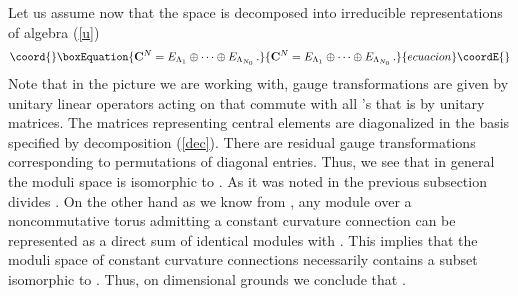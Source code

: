 \documentclass[a4paper,a4paper]{article}
\begin{document}
Let us assume now that the space   \coordHE{} is decomposed into irreducible representations of algebra (\ref{u})
\begin{equation}\coord{}\boxEquation{ \label{dec}
{\bf C}^{N} = E_{\Lambda_{1}}\oplus \dots \oplus E_{\Lambda_{N_{0}}}\, .
}{ {\bf C}^{N} = E_{\Lambda_{1}}\oplus \dots \oplus E_{\Lambda_{N_{0}}}\, .
}{ecuacion}\coordE{}\end{equation}
Note that in the picture we are working with,  gauge transformations are given by unitary linear operators acting on \coordHE{} that 
commute with all \coordHE{}'s that is by unitary \coordHE{} matrices.  
 The matrices representing central elements are diagonalized in the basis specified by  decomposition (\ref{dec}). 
There are residual gauge transformations corresponding to permutations of diagonal entries. Thus, we see that in  general 
 the moduli space is isomorphic to \coordHE{}. 
As it was noted   in the previous subsection \coordHE{} divides \coordHE{}.
On the other hand as we know from \cite{AstSchw}, \cite{KS} any module \coordHE{} over a noncommutative torus \coordHE{} 
admitting a constant curvature connection \coordHE{} 
can be represented as a direct sum of \coordHE{} identical modules  \coordHE{} with 
\coordHE{}. This implies that the moduli space of constant curvature connections necessarily contains 
a subset isomorphic to \coordHE{}. Thus, on dimensional grounds we conclude that \coordHE{}. 


\end{document}
